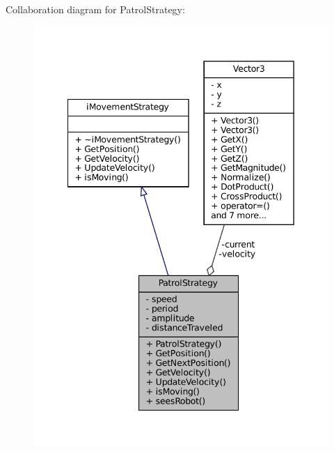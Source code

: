 Collaboration diagram for Patrol\+Strategy\+:\nopagebreak
\begin{figure}[H]
\begin{center}
\leavevmode
\includegraphics[width=342pt]{classPatrolStrategy__coll__graph}
\end{center}
\end{figure}
